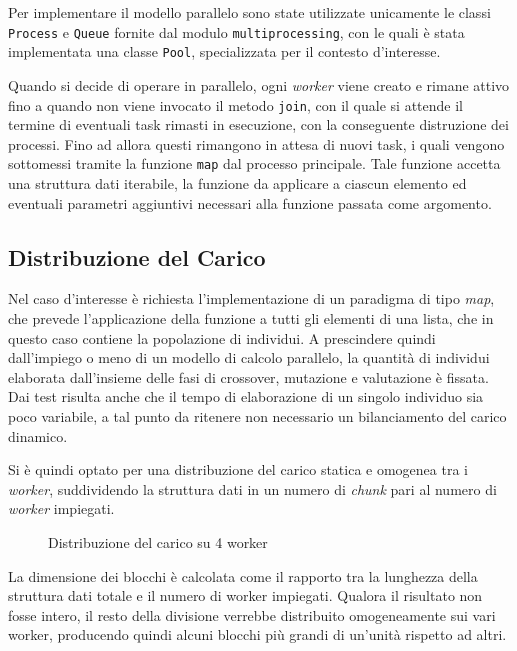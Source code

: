 Per implementare il modello parallelo sono state utilizzate unicamente le classi
\verb|Process| e \verb|Queue| fornite dal modulo \verb|multiprocessing|, con le
quali è stata implementata una classe \verb|Pool|, specializzata per il contesto
d'interesse.

Quando si decide di operare in parallelo, ogni \textit{worker} viene creato e
rimane attivo fino a quando non viene invocato il metodo \verb|join|, con il
quale si attende il termine di eventuali task rimasti in esecuzione, con la
conseguente distruzione dei processi. Fino ad allora questi rimangono in attesa
di nuovi task, i quali vengono sottomessi tramite la funzione \verb|map| dal
processo principale. Tale funzione accetta una struttura dati iterabile, la
funzione da applicare a ciascun elemento ed eventuali parametri aggiuntivi
necessari alla funzione passata come argomento.

\subsection{Distribuzione del Carico}

Nel caso d'interesse è richiesta l'implementazione di un paradigma di tipo
\textit{map}, che prevede l'applicazione della funzione a tutti gli elementi di
una lista, che in questo caso contiene la popolazione di individui. A
prescindere quindi dall'impiego o meno di un modello di calcolo parallelo, la
quantità di individui elaborata dall'insieme delle fasi di crossover, mutazione
e valutazione è fissata. Dai test risulta anche che il tempo di elaborazione di
un singolo individuo sia poco variabile, a tal punto da ritenere non necessario
un bilanciamento del carico dinamico.

Si è quindi optato per una distribuzione del carico statica e omogenea tra i
\textit{worker}, suddividendo la struttura dati in un numero di \textit{chunk}
pari al numero di \textit{worker} impiegati.

\begin{figure}[H]
	\centering
	
	\caption{Distribuzione del carico su 4 worker}
	\label{fig: workload}
\end{figure}

La dimensione dei blocchi è calcolata come il rapporto tra la lunghezza della
struttura dati totale e il numero di worker impiegati. Qualora il risultato non
fosse intero, il resto della divisione verrebbe distribuito omogeneamente sui
vari worker, producendo quindi alcuni blocchi più grandi di un'unità rispetto
ad altri.

